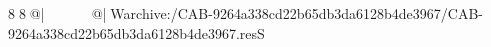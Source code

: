 8  8  @|                                                  @| W   archive:/CAB-9264a338cd22b65db3da6128b4de3967/CAB-9264a338cd22b65db3da6128b4de3967.resS 